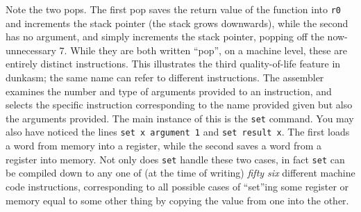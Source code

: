 \documentclass{article}
\begin{document}
Note the two pops. The first pop saves the return value of the function into \Verb|r0| and increments the stack pointer (the stack grows downwards), while the second has no argument, and simply increments the stack pointer, popping off the now-unnecessary 7. While they are both written ``pop'', on a machine level, these are entirely distinct instructions. This illustrates the third quality-of-life feature in dunkasm; the same name can refer to different instructions. The assembler examines the number and type of arguments provided to an instruction, and selects the specific instruction corresponding to the name provided given but also the arguments provided. The main instance of this is the \Verb|set| command. You may also have noticed the lines \Verb|set x argument 1| and \Verb|set result x|. The first loads a word from memory into a register, while the second saves a word from a register into memory. Not only does \Verb|set| handle these two cases, in fact \Verb|set| can be compiled down to any one of (at the time of writing) \textit{fifty six} different machine code instructions, corresponding to all possible cases of ``set''ing some register or memory equal to some other thing by copying the value from one into the other.
\end{document}
